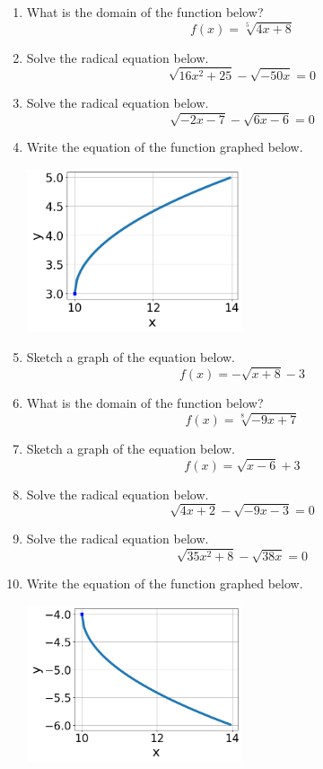 \documentclass[14pt]{extbook}
\begin{document}
\begin{enumerate}
\item{
What is the domain of the function below?\[ f(x) = \sqrt[5]{4 x + 8} \]} \newpage
\item{
Solve the radical equation below.\[ \sqrt{16 x^2 + 25} - \sqrt{-50 x} = 0 \]} \newpage
\item{
Solve the radical equation below.\[ \sqrt{-2 x - 7} - \sqrt{6 x - 6} = 0 \]} \newpage
\item{
Write the equation of the function graphed below.
\begin{center}
    \includegraphics[width=0.5\textwidth]{../Figures/radicalGraphToEquationA.png}
\end{center}
} \newpage
\item{
Sketch a graph of the equation below.\[ f(x) = - \sqrt{x + 8} - 3 \]} \newpage
\item{
What is the domain of the function below?\[ f(x) = \sqrt[8]{-9 x + 7} \]} \newpage
\item{
Sketch a graph of the equation below.\[ f(x) = \sqrt{x - 6} + 3 \]} \newpage
\item{
Solve the radical equation below.\[ \sqrt{4 x + 2} - \sqrt{-9 x - 3} = 0 \]} \newpage
\item{
Solve the radical equation below.\[ \sqrt{35 x^2 + 8} - \sqrt{38 x} = 0 \]} \newpage
\item{
Write the equation of the function graphed below.
\begin{center}
    \includegraphics[width=0.5\textwidth]{../Figures/radicalGraphToEquationCopyA.png}

\end{center}}
\end{enumerate}
\end{document}
